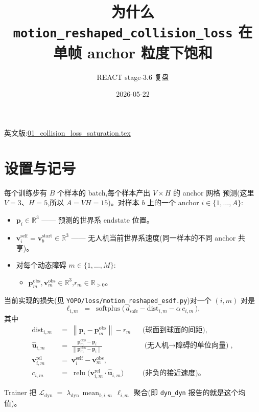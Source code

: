 \documentclass[UTF8, 11pt]{ctexart}
\title{为什么 \texttt{motion\_reshaped\_collision\_loss} 在\\单帧 anchor 粒度下饱和}
\author{REACT stage-3.6 复盘}
\date{2026-05-22}
\newcommand{\R}{\mathbb{R}}
\newcommand{\Norm}[1]{\left\lVert #1 \right\rVert}
\newcommand{\relu}{\operatorname{relu}}
\newcommand{\softplus}{\operatorname{softplus}}
\begin{document}
\maketitle

英文版:\href{run:./01_collision_loss_saturation.tex}{01\_collision\_loss\_saturation.tex}

\section{设置与记号}

每个训练步有 $B$ 个样本的 batch,每个样本产出 $V \times H$ 的 anchor 网格
预测(这里 $V=3$、$H=5$,所以 $A = V H = 15$)。对样本 $b$ 上的一个 anchor
$i \in \{1, \dots, A\}$:
\begin{itemize}
  \item $\bm{p}_i \in \R^3$ —— 预测的世界系 endstate 位置。
  \item $\bm{v}_i^{\text{self}} = \bm{v}_b^{\text{start}} \in \R^3$ ——
        无人机当前世界系速度(同一样本的不同 anchor 共享)。
  \item 对每个动态障碍 $m \in \{1, \dots, M\}$:
    \begin{itemize}
      \item $\bm{p}_m^{\text{obs}}, \bm{v}_m^{\text{obs}} \in \R^3$,$r_m \in \R_{>0}$。
    \end{itemize}
\end{itemize}

当前实现的损失(见 \texttt{YOPO/loss/motion\_reshaped\_esdf.py})对一个
$(i, m)$ 对是
\begin{equation}\label{eq:loss}
\ell_{i,m} \;=\;
\softplus\!\bigl(\,d_{\text{safe}} - \mathrm{dist}_{i,m} - \alpha\, c_{i,m}\,\bigr),
\end{equation}
其中
\begin{align}
\mathrm{dist}_{i,m} &\;=\; \Norm{\bm{p}_i - \bm{p}_m^{\text{obs}}} - r_m
  &&\text{(球面到球面的间距)},\\
\hat{\bm{u}}_{i,m} &\;=\; \frac{\bm{p}_m^{\text{obs}} - \bm{p}_i}{\Norm{\bm{p}_m^{\text{obs}} - \bm{p}_i}}
  &&\text{(无人机$\to$障碍的单位向量)},\\
\bm{v}_{i,m}^{\text{rel}} &\;=\; \bm{v}_i^{\text{self}} - \bm{v}_m^{\text{obs}},\\
c_{i,m} &\;=\; \relu\!\bigl(\bm{v}_{i,m}^{\text{rel}} \cdot \hat{\bm{u}}_{i,m}\bigr)
  &&\text{(非负的接近速度)}。\label{eq:closing}
\end{align}

Trainer 把
\(
\mathcal{L}_{\text{dyn}} \;=\; \lambda_{\text{dyn}}\,
\operatorname*{mean}_{b, i, m}\, \ell_{i,m}
\)
聚合(即 \texttt{dyn\_dyn} 报告的就是这个均值)。
\end{document}
